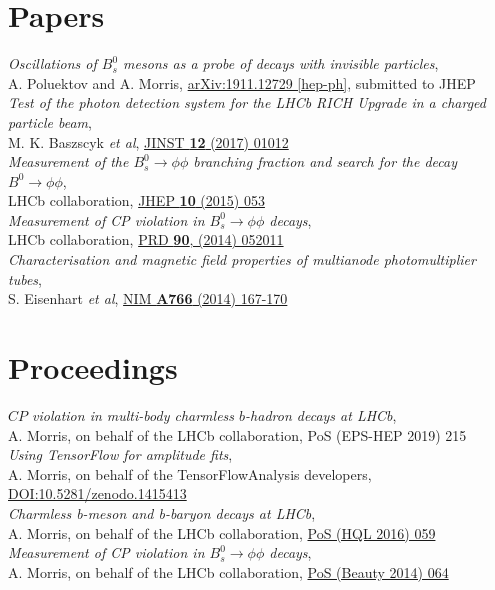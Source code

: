 \section{Papers}
\vspace{0.5em}
\textit{Oscillations of $B_s^0$ mesons as a probe of decays with invisible particles},\\ A. Poluektov and A. Morris, \href{https://arxiv.org/abs/1911.12729}{arXiv:1911.12729 [hep-ph]}, submitted to JHEP\\[1ex]
\textit{Test of the photon detection system for the LHCb RICH Upgrade in a charged particle beam},\\ M. K. Baszscyk \textit{et al}, \href{http://cds.cern.ch/record/2197586}{JINST \textbf{12} (2017) 01012}\\[1ex]
\textit{Measurement of the $B^0_s \to \phi\phi$ branching fraction and search for the decay $B^0 \to \phi \phi$},\\ LHCb collaboration, \href{http://dx.doi.org/10.1007/JHEP10(2015)053}{JHEP \textbf{10} (2015) 053}\\[1ex]
\textit{Measurement of CP violation in $B^0_s \to \phi\phi$ decays},\\ LHCb collaboration, \href{http://dx.doi.org/10.1103/PhysRevD.90.052011}{PRD \textbf{90}, (2014) 052011}\\[1ex]
\textit{Characterisation and magnetic field properties of multianode photomultiplier tubes},\\ S. Eisenhart \textit{et al}, \href{http://dx.doi.org/10.1016/j.nima.2014.05.036}{NIM \textbf{A766} (2014) 167-170}\\[1ex]
\section{Proceedings}
\vspace{0.5em}
\textit{$C\!P$ violation in multi-body charmless $b$-hadron decays at LHCb},\\ A. Morris, on behalf of the LHCb collaboration, PoS (EPS-HEP 2019) 215\\[1ex]
\textit{Using TensorFlow for amplitude fits},\\ A. Morris, on behalf of the TensorFlowAnalysis developers, \href{https://doi.org/10.5281/zenodo.1415413}{DOI:10.5281/zenodo.1415413}\\[1ex]
\textit{Charmless b-meson and b-baryon decays at LHCb},\\ A. Morris, on behalf of the LHCb collaboration, \href{https://pos.sissa.it/cgi-bin/reader/contribution.cgi?id=274/059}{PoS (HQL 2016) 059}\\[1ex]
\textit{Measurement of CP violation in $B^0_s \to \phi\phi$ decays},\\ A. Morris, on behalf of the LHCb collaboration, \href{https://pos.sissa.it/cgi-bin/reader/contribution.cgi?id=216/064}{PoS (Beauty 2014) 064}\\[1ex]

